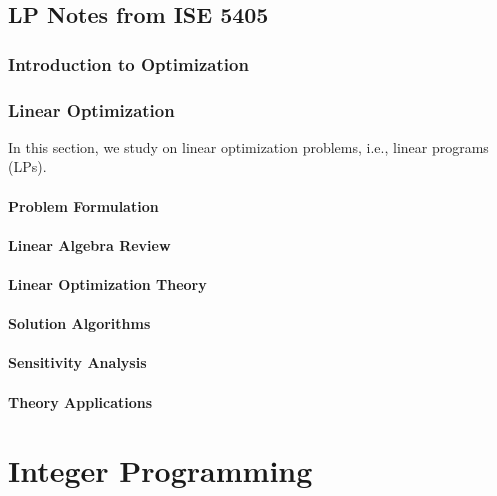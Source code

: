 \documentclass[letter,12pt]{book}
\renewcommand{\0}{\mathbf{0}}
\begin{document}
\chapter{LP Notes from ISE 5405}
\section{Introduction to Optimization}


\newpage \section{Linear Optimization}
In this section, we study on linear optimization problems, i.e., linear programs (LPs).

\subsection{Problem Formulation} 


\subsection{Linear Algebra Review} 


\subsection{Linear Optimization Theory} 


\subsection{Solution Algorithms}  


\subsection{Sensitivity Analysis} 


\subsection{Theory Applications} 


%

\part{Integer Programming}
\label{part:IntegerProgramming}






\end{document}

